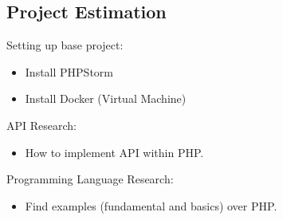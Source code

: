 \subsection{Project Estimation}
    Setting up base project:
	\begin{itemize}
		\item Install PHPStorm
		\item Install Docker (Virtual Machine)
	\end{itemize}
	API Research:
	\begin{itemize}
		\item How to implement API within PHP.
	\end{itemize}
	Programming Language Research:
	\begin{itemize}
		\item Find examples (fundamental and basics) over PHP.
	\end{itemize}